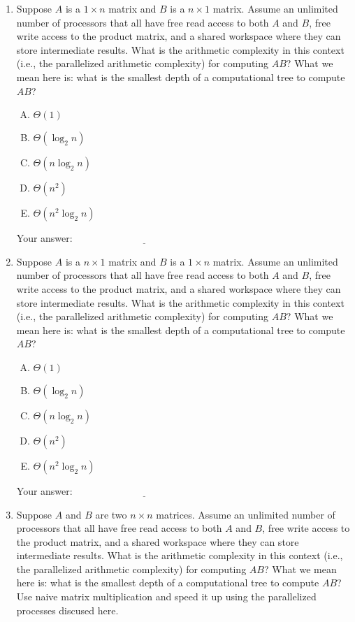 \documentclass[10pt]{amsart}
\begin{document}
\begin{enumerate}
\item Suppose $A$ is a $1 \times n$ matrix and $B$ is a $n \times 1$
  matrix. Assume an unlimited number of processors that all have free
  read access to both $A$ and $B$, free write access to the product
  matrix, and a shared workspace where they can store intermediate
  results. What is the arithmetic complexity in this context (i.e.,
  the parallelized arithmetic complexity) for computing $AB$? What we
  mean here is: what is the smallest depth of a computational tree to
  compute $AB$?

  \begin{enumerate}[(A)]
  \item $\Theta(1)$
  \item $\Theta(\log_2 n)$
  \item $\Theta(n \log_2 n)$
  \item $\Theta(n^2)$
  \item $\Theta(n^2 \log_2 n)$
  \end{enumerate}

  \vspace{0.1in}
  Your answer: $\underline{\qquad\qquad\qquad\qquad\qquad\qquad\qquad}$
  \vspace{0.1in}

\item Suppose $A$ is a $n \times 1$ matrix and $B$ is a $1 \times n$
  matrix. Assume an unlimited number of processors that all have free
  read access to both $A$ and $B$, free write access to the product
  matrix, and a shared workspace where they can store intermediate
  results. What is the arithmetic complexity in this context (i.e.,
  the parallelized arithmetic complexity) for computing $AB$? What we
  mean here is: what is the smallest depth of a computational tree to
  compute $AB$?

  \begin{enumerate}[(A)]
  \item $\Theta(1)$
  \item $\Theta(\log_2 n)$
  \item $\Theta(n \log_2 n)$
  \item $\Theta(n^2)$
  \item $\Theta(n^2 \log_2 n)$
  \end{enumerate}

  \vspace{0.1in}
  Your answer: $\underline{\qquad\qquad\qquad\qquad\qquad\qquad\qquad}$
  \vspace{0.1in}

\item Suppose $A$ and $B$ are two $n \times n$ matrices. Assume an
  unlimited number of processors that all have free read access to
  both $A$ and $B$, free write access to the product matrix, and a
  shared workspace where they can store intermediate results. What is
  the arithmetic complexity in this context (i.e., the parallelized
  arithmetic complexity) for computing $AB$? What we mean here is:
  what is the smallest depth of a computational tree to compute $AB$?
  Use naive matrix multiplication and speed it up using the
  parallelized processes discused here.


\end{enumerate}
\end{document}
